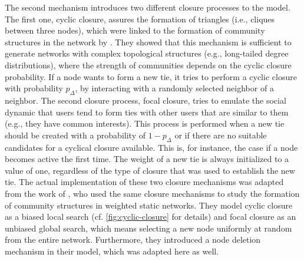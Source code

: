 The second mechanism introduces two different closure processes to the model.
The first one, cyclic closure, assures the formation of triangles (i.e., cliques between three nodes), which were linked to the formation of community structures in the network by \citet{Bianconi2014}.
They showed that this mechanism is sufficient to generate networks with complex topological structures (e.g., long-tailed degree distributions), where the strength of communities depends on the cyclic closure probability.
If a node wants to form a new tie, it tries to perform a cyclic closure with probability \( p_{\Delta} \), by interacting with a randomly selected neighbor of a neighbor.
The second closure process, focal closure, tries to emulate the social dynamic that users tend to form ties with other users that are similar to them (e.g., they have common interests).
This process is performed when a new tie should be created with a probability of \( 1 - p_{\Delta} \) or if there are no suitable candidates for a cyclical closure available.
This is, for instance, the case if a node becomes active the first time.
The weight of a new tie is always initialized to a value of one, regardless of the type of closure that was used to establish the new tie.
The actual implementation of these two closure mechanisms was adapted from the work of \citet{Kumpula2007}, who used the same closure mechanisms to study the formation of community structures in weighted static networks.
They model cyclic closure as a biased local search (cf. \autoref{fig:cyclic-closure} for details) and focal closure as an unbiased global search, which means selecting a new node uniformly at random from the entire network.
Furthermore, they introduced a node deletion mechanism in their model, which was adapted here as well.


